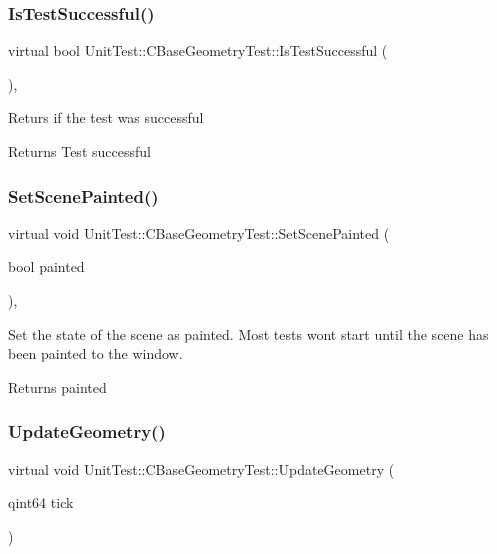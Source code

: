 \subsubsection{\texorpdfstring{IsTestSuccessful()}{IsTestSuccessful()}}
{\footnotesize\ttfamily virtual bool Unit\+Test\+::\+C\+Base\+Geometry\+Test\+::\+Is\+Test\+Successful (\begin{DoxyParamCaption}{ }\end{DoxyParamCaption})\hspace{0.3cm}{\ttfamily [inline]}, {\ttfamily [virtual]}}

Returs if the test was successful \begin{DoxyReturn}{Returns}
Test successful 
\end{DoxyReturn}
\mbox{\label{class_unit_test_1_1_c_base_geometry_test_a394a19d424a416ade87e4d09978337bf}} 
\subsubsection{\texorpdfstring{SetScenePainted()}{SetScenePainted()}}
{\footnotesize\ttfamily virtual void Unit\+Test\+::\+C\+Base\+Geometry\+Test\+::\+Set\+Scene\+Painted (\begin{DoxyParamCaption}\item[{bool}]{painted }\end{DoxyParamCaption})\hspace{0.3cm}{\ttfamily [inline]}, {\ttfamily [virtual]}}

Set the state of the scene as painted. Most tests won\textquotesingle{}t start until the scene has been painted to the window. \begin{DoxyReturn}{Returns}
painted 
\end{DoxyReturn}
\mbox{\label{class_unit_test_1_1_c_base_geometry_test_afe9560d667ef457f7a203453c10593fd}} 
\subsubsection{\texorpdfstring{UpdateGeometry()}{UpdateGeometry()}}
{\footnotesize\ttfamily virtual void Unit\+Test\+::\+C\+Base\+Geometry\+Test\+::\+Update\+Geometry (\begin{DoxyParamCaption}\item[{qint64}]{tick }\end{DoxyParamCaption})\hspace{0.3cm}{\ttfamily [pure virtual]}}

